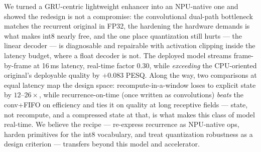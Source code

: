 \documentclass{article}
\begin{document}
We turned a GRU-centric lightweight enhancer into an NPU-native one and showed
the redesign is not a compromise: the convolutional dual-path bottleneck
matches the recurrent original in FP32, the hardening the hardware demands is
what makes int8 nearly free, and the one place quantization still hurts --- the
linear decoder --- is diagnosable and repairable with activation clipping
inside the latency budget, where a float decoder is not. The deployed model
streams frame-by-frame at 16\,ms latency, real-time factor 0.30, while
\emph{exceeding} the CPU-oriented original's deployable quality by $+0.083$
PESQ. Along the way, two comparisons at equal latency map the design space:
recompute-in-a-window loses to explicit state by $12\text{--}26\times$, while
recurrence-on-time (once written as convolutions) \emph{beats} the conv+FIFO
on efficiency and ties it on quality at long receptive fields --- state, not
recompute, and a compressed state at that, is what makes this class of model
real-time. We believe the recipe --- re-express recurrence as NPU-native ops,
harden primitives for the int8 vocabulary, and treat quantization robustness
as a design criterion --- transfers beyond this model and accelerator.

\vfill\pagebreak



\end{document}
